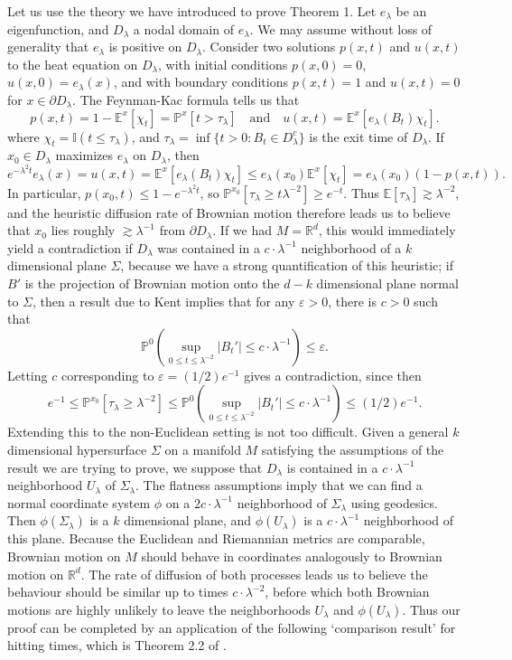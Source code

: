 \documentclass[12pt]{article}
\newcommand*{\R}{\mathbb{R}}
\begin{document}
Let us use the theory we have introduced to prove Theorem 1. Let $e_\lambda$ be an eigenfunction, and $D_\lambda$ a nodal domain of $e_\lambda$. We may assume without loss of generality that $e_\lambda$ is positive on $D_\lambda$. Consider two solutions $p(x,t)$ and $u(x,t)$ to the heat equation on $D_\lambda$, with initial conditions $p(x,0) = 0$, $u(x,0) = e_\lambda(x)$, and with boundary conditions $p(x,t) = 1$ and $u(x,t) = 0$ for $x \in \partial D_\lambda$. The Feynman-Kac formula tells us that
%
\[ p(x,t) = 1 - \mathbb{E}^x[\chi_t] = \mathbb{P}^x[t > \tau_\lambda] \quad\text{and}\quad u(x,t) = \mathbb{E}^x[ e_\lambda(B_t) \chi_t ]. \]
%
where $\chi_t = \mathbb{I}(t \leq \tau_\lambda)$, and $\tau_\lambda = \inf \{ t > 0 : B_t \in D_\lambda^c \}$ is the exit time of $D_\lambda$. If $x_0 \in D_\lambda$ maximizes $e_\lambda$ on $D_\lambda$, then
%
\[ e^{- \lambda^2 t} e_\lambda(x) = u(x,t) = \mathbb{E}^x[ e_\lambda(B_t) \chi_t ] \leq e_\lambda(x_0) \mathbb{E}^x[\chi_t] = e_\lambda(x_0) (1 - p(x,t)). \]
%
In particular, $p(x_0,t) \leq 1 - e^{-\lambda^2 t}$, so $\mathbb{P}^{x_0}[\tau_\lambda \geq t \lambda^{-2}] \geq e^{-t}$. Thus $\mathbb{E}[\tau_\lambda] \gtrsim \lambda^{-2}$, and the heuristic diffusion rate of Brownian motion therefore leads us to believe that $x_0$ lies roughly $\gtrsim \lambda^{-1}$ from $\partial D_\lambda$. If we had $M = \R^d$, this would immediately yield a contradiction if $D_\lambda$ was contained in a $c \cdot \lambda^{-1}$ neighborhood of a $k$ dimensional plane $\Sigma$, because we have a strong quantification of this heuristic; if $B'$ is the projection of Brownian motion onto the $d-k$ dimensional plane normal to $\Sigma$, then a result due to Kent \cite{kent} implies that for any $\varepsilon > 0$, there is $c > 0$ such that
%
\[ \mathbb{P}^0 \left( \sup_{0 \leq t \leq \lambda^{-2}} |B_t'| \leq c \cdot \lambda^{-1} \right) \leq \varepsilon. \]
%
Letting $c$ corresponding to $\varepsilon = (1/2) e^{-1}$ gives a contradiction, since then
%
\[ e^{-1} \leq \mathbb{P}^{x_0}[\tau_\lambda \geq \lambda^{-2}] \leq \mathbb{P}^0 \left( \sup_{0 \leq t \leq \lambda^{-2}} |B_t'| \leq c \cdot \lambda^{-1} \right) \leq (1/2) e^{-1}. \]
%
Extending this to the non-Euclidean setting is not too difficult. Given a general $k$ dimensional hypersurface $\Sigma$ on a manifold $M$ satisfying the assumptions of the result we are trying to prove, we suppose that $D_\lambda$ is contained in a $c \cdot \lambda^{-1}$ neighborhood $U_\lambda$ of $\Sigma_\lambda$. The flatness assumptions imply that we can find a normal coordinate system $\phi$ on a $2c \cdot \lambda^{-1}$ neighborhood of $\Sigma_\lambda$ using geodesics. Then $\phi(\Sigma_\lambda)$ is a $k$ dimensional plane, and $\phi(U_\lambda)$ is a $c \cdot \lambda^{-1}$ neighborhood of this plane. Because the Euclidean and Riemannian metrics are comparable, Brownian motion on $M$ should behave in coordinates analogously to Brownian motion on $\R^d$. The rate of diffusion of both processes leads us to believe the behaviour should be similar up to times $c \cdot \lambda^{-2}$, before which both Brownian motions are highly unlikely to leave the neighborhoods $U_\lambda$ and $\phi(U_\lambda)$. Thus our proof can be completed by an application of the following `comparison result' for hitting times, which is Theorem 2.2 of \cite{georgiev}.
\end{document}
